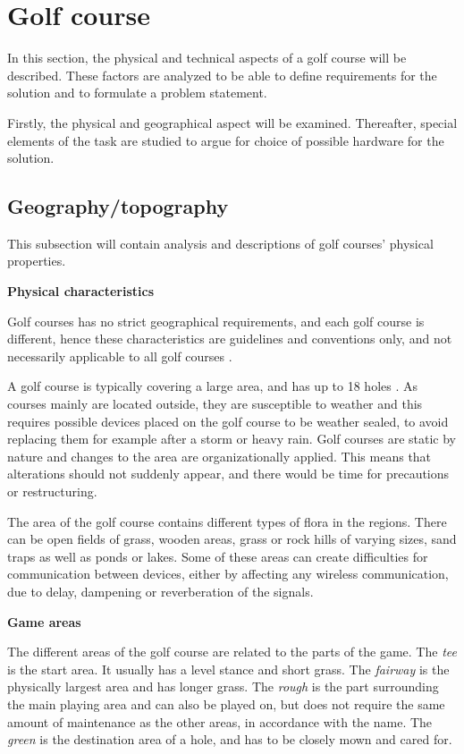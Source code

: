 \section{Golf course}
In this section, the physical and technical aspects of a golf course will be described. These factors are analyzed to be able to define requirements for the solution and to formulate a problem statement.

Firstly, the physical and geographical aspect will be examined. Thereafter, special elements of the task are studied to argue for choice of possible hardware for the solution. 

\subsection{Geography/topography}
This subsection will contain analysis and descriptions of golf courses' physical properties.

\textbf{Physical characteristics}

Golf courses has no strict geographical requirements, and each golf course is different, hence these characteristics are guidelines and conventions only, and not necessarily applicable to all golf courses \cite{golfCourse}.

A golf course is typically covering a large area, and has up to 18 holes \cite{golfCourse}. As courses mainly are located outside, they are susceptible to weather and this requires possible devices placed on the golf course to be weather sealed, to avoid replacing them for example after a storm or heavy rain. Golf courses are static by nature and changes to the area are organizationally applied. This means that alterations should not suddenly appear, and there would be time for precautions or restructuring. 

The area of the golf course contains different types of flora in the regions. There can be open fields of grass, wooden areas, grass or rock hills of varying sizes, sand traps as well as ponds or lakes. Some of these areas can create difficulties for communication between devices, either by affecting any wireless communication, due to delay, dampening or reverberation of the signals. 

\textbf{Game areas}

The different areas of the golf course are related to the parts of the game. The \textit{tee} is the start area. It usually has a level stance and short grass. The \textit{fairway} is the physically largest area and has longer grass. The \textit{rough} is the part surrounding the main playing area and can also be played on, but does not require the same amount of maintenance as the other areas, in accordance with the name. The \textit{green} is the destination area of a hole, and has to be closely mown and cared for. 

